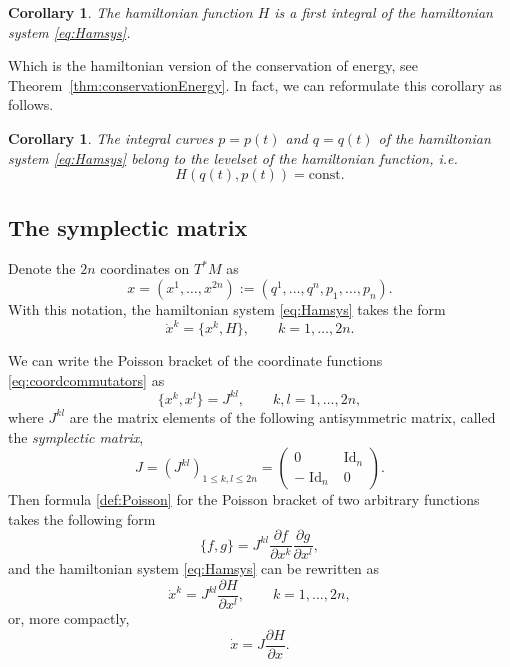 \documentclass[english,fontsize=11pt,paper=a5,oneside]{scrbook}
\DeclareMathOperator{\Id}{Id}
\newtheorem{corollary}[theorem]{Corollary}
\theoremstyle{definition}
\begin{document}
\begin{corollary}
  The hamiltonian function $H$ is a first integral of the hamiltonian system \eqref{eq:Hamsys}.
\end{corollary}
Which is the hamiltonian version of the conservation of energy, see Theorem~\ref{thm:conservationEnergy}.
In fact, we can reformulate this corollary as follows.
\begin{corollary}
  The integral curves $p = p(t)$ and $q=q(t)$ of the hamiltonian system \eqref{eq:Hamsys} belong to the levelset of the hamiltonian function, i.e.
  \begin{equation}
    H(q(t), p(t)) = \mathrm{const}.
  \end{equation}
\end{corollary}

\subsection{The symplectic matrix}\label{sec:symplmat}
Denote the $2n$ coordinates on $T^*M$ as
\begin{equation}
  x=(x^1, \ldots, x^{2n}) := (q^1, \ldots, q^n, p_1, \ldots, p_n).
\end{equation}
With this notation, the hamiltonian system \eqref{eq:Hamsys} takes the form
\begin{equation}
  \dot x^k = \big\{x^k, H\big\}, \qquad k=1,\ldots,2n.
\end{equation}

We can write the Poisson bracket of the coordinate functions \eqref{eq:coordcommutators} as
\begin{equation}
  \big\{x^k, x^l\big\} = J^{kl}, \qquad k,l = 1,\ldots,2n,
\end{equation}
where $J^{kl}$ are the matrix elements of the following antisymmetric matrix, called the \emph{symplectic matrix},
\begin{equation}\label{eq:symmat}
  J = \left(J^{kl}\right)_{1\leq k,l\leq2n} = \begin{pmatrix}0 & \Id_n \\ -\Id_n & 0\end{pmatrix}.
\end{equation}
Then formula \eqref{def:Poisson} for the Poisson bracket of two arbitrary functions takes the following form
\begin{equation}\label{eq:coordPB}
  \big\{f,g\big\} = J^{kl} \frac{\partial f}{\partial x^k}\frac{\partial g}{\partial x^l},
\end{equation}
and the hamiltonian system \eqref{eq:Hamsys} can be rewritten as
\begin{equation}
  \dot x^k = J^{kl} \frac{\partial H}{\partial x^l}, \qquad k=1,\ldots,2n,
\end{equation}
or, more compactly,
\begin{equation}\label{eq:hamsysJ}
  \dot x = J \frac{\partial H}{\partial x}.
\end{equation}
\end{document}
